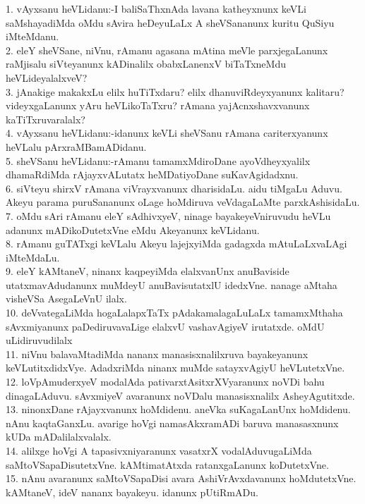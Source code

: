 \documentclass{article}
\begin{document}
1. vAyxsanu heVLidanu:-I baliSaThxnAda lavana katheyxnunx keVLi saMshayadiMda oMdu sAvira heDeyuLaLx A sheVSananunx kuritu QuSiyu iMteMdanu.\\
2. eleY sheVSane, niVnu, rAmanu agasana mAtina meVle parxjegaLanunx raMjisalu siVteyanunx kADinalilx obabxLanenxV biTaTxneMdu heVLideyalalxveV?\\
3. jAnakige makakxLu elilx huTiTxdaru? elilx dhanuviRdeyxyanunx kalitaru? videyxgaLanunx yAru heVLikoTaTxru? rAmana yajAcnxshavxvanunx kaTiTxruvaralalx?\\
4. vAyxsanu heVLidanu:-idanunx keVLi sheVSanu rAmana cariterxyanunx heVLalu pArxraMBamADidanu.\\
5. sheVSanu heVLidanu:-rAmanu tamamxMdiroDane ayoVdheyxyalilx dhamaRdiMda rAjayxvALutatx heMDatiyoDane suKavAgidadxnu.\\
6. siVteyu shirxV rAmana viVrayxvanunx dharisidaLu. aidu tiMgaLu Aduvu. Akeyu parama puruSananunx oLage hoMdiruva veVdagaLaMte parxkAshisidaLu.\\
7. oMdu sAri rAmanu eleY sAdhivxyeV, ninage bayakeyeVniruvudu heVLu adanunx mADikoDutetxVne eMdu Akeyanunx keVLidanu.\\
8. rAmanu guTATxgi keVLalu Akeyu lajejxyiMda gadagxda mAtuLaLxvaLAgi iMteMdaLu.\\
9. eleY kAMtaneV, ninanx kaqpeyiMda elalxvanUnx anuBaviside utatxmavAdudanunx muMdeyU anuBavisutatxlU idedxVne. nanage aMtaha visheVSa AsegaLeVnU ilalx.\\
10. deVvategaLiMda hogaLalapxTaTx pAdakamalagaLuLaLx tamamxMthaha sAvxmiyanunx paDediruvavaLige elalxvU vashavAgiyeV irutatxde. oMdU uLidiruvudilalx\\
11. niVnu balavaMtadiMda nananx manasisxnalilxruva bayakeyanunx keVLutitxdidxVye. AdadxriMda ninanx muMde satayxvAgiyU heVLutetxVne.\\
12. loVpAmuderxyeV modalAda pativarxtAsitxrXVyaranunx noVDi bahu dinagaLAduvu. sAvxmiyeV avaranunx noVDalu manasisxnalilx AsheyAgutitxde.\\
13. ninonxDane rAjayxvanunx hoMdidenu. aneVka suKagaLanUnx hoMdidenu. nAnu kaqtaGanxLu. avarige hoVgi namasAkxramADi baruva manasasxnunx kUDa mADalilalxvalalx.\\
14. alilxge hoVgi A tapasivxniyaranunx vasatxrX vodalAduvugaLiMda saMtoVSapaDisutetxVne. kAMtimatAtxda ratanxgaLanunx koDutetxVne.\\
15. nAnu avaranunx saMtoVSapaDisi avara AshiVrAvxdavanunx hoMdutetxVne. kAMtaneV, ideV nananx bayakeyu. idanunx pUtiRmADu.\\
\end{document}
